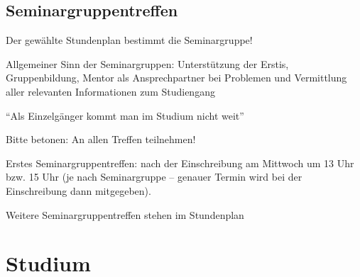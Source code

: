 \documentclass[a4paper,12pt]{report}
\begin{document}
\subsection{Seminargruppentreffen}
\begin{itemize*}
    \item Der gewählte Stundenplan bestimmt die Seminargruppe!
    \item Allgemeiner Sinn der Seminargruppen: Unterstützung der Erstis, Gruppenbildung, Mentor als Ansprechpartner bei Problemen und Vermittlung aller relevanten Informationen zum Studiengang
    \item \enquote{Als Einzelgänger kommt man im Studium nicht weit}
    \item Bitte betonen: An allen Treffen teilnehmen!
    \item Erstes Seminargruppentreffen: nach der Einschreibung am Mittwoch um 13 Uhr bzw. 15 Uhr (je nach Seminargruppe -- genauer Termin wird bei der Einschreibung dann mitgegeben).
    \item Weitere Seminargruppentreffen stehen im Stundenplan
\end{itemize*}
\newpage
\section{Studium}
\end{document}
